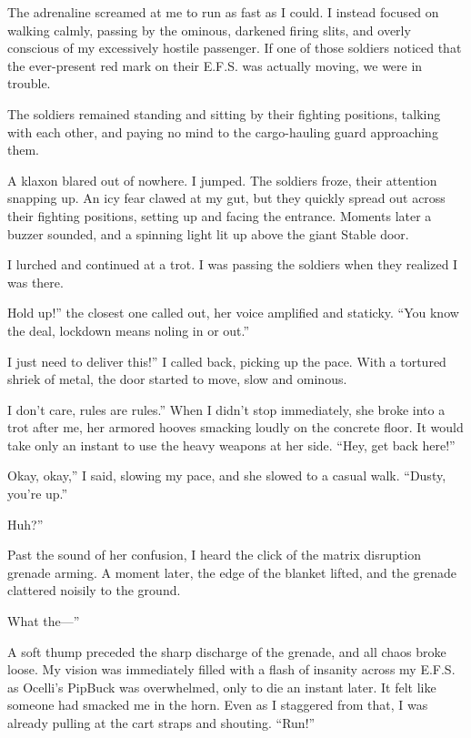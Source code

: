 The adrenaline screamed at me to run as fast as I could. I instead focused on walking calmly, passing by the ominous, darkened firing slits, and overly conscious of my excessively hostile passenger. If one of those soldiers noticed that the ever-present red mark on their E.F.S. was actually moving, we were in trouble.

The soldiers remained standing and sitting by their fighting positions, talking with each other, and paying no mind to the cargo-hauling guard approaching them.

A klaxon blared out of nowhere. I jumped. The soldiers froze, their attention snapping up. An icy fear clawed at my gut, but they quickly spread out across their fighting positions, setting up and facing the entrance. Moments later a buzzer sounded, and a spinning light lit up above the giant Stable door.

I lurched and continued at a trot. I was passing the soldiers when they realized I was there.

\leavevmode{}Hold up!” the closest one called out, her voice amplified and staticky. “You know the deal, lockdown means noling in or out.”

\leavevmode{}I just need to deliver this!” I called back, picking up the pace. With a tortured shriek of metal, the door started to move, slow and ominous.

\leavevmode{}I don’t care, rules are rules.” When I didn’t stop immediately, she broke into a trot after me, her armored hooves smacking loudly on the concrete floor. It would take only an instant to use the heavy weapons at her side. “Hey, get back here!”

\leavevmode{}Okay, okay,” I said, slowing my pace, and she slowed to a casual walk. “Dusty, you’re up.”

\leavevmode{}Huh?”

Past the sound of her confusion, I heard the click of the matrix disruption grenade arming. A moment later, the edge of the blanket lifted, and the grenade clattered noisily to the ground.

\leavevmode{}What the—”

A soft thump preceded the sharp discharge of the grenade, and all chaos broke loose. My vision was immediately filled with a flash of insanity across my E.F.S. as Ocelli’s PipBuck was overwhelmed, only to die an instant later. It felt like someone had smacked me in the horn. Even as I staggered from that, I was already pulling at the cart straps and shouting. “Run!”

